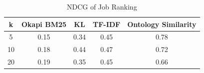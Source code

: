 \begin{table}[ht]
\caption{NDCG of Job Ranking } %
\centering %
\begin{tabular}{    | c | c | c | c | c |  }
 \hline
       k    & Okapi BM25 & KL    & TF-IDF & Ontology Similarity  \\
 \hline
       5    & 0.15       & 0.34  & 0.45     & 0.78   \\
 \hline
       10   & 0.18       & 0.44  & 0.47     & 0.72   \\
 \hline
       20   & 0.19       & 0.35  & 0.45     & 0.66   \\
 \hline
 
\end{tabular}
\label{tab:job_ndcg} %
\end{table}



